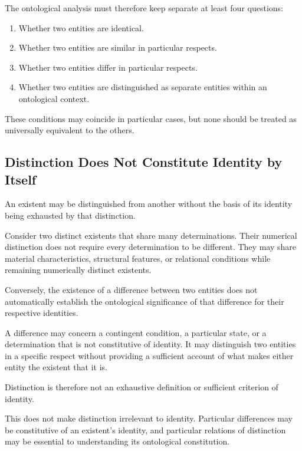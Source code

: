 The ontological analysis must therefore keep
separate at least four questions:

\begin{enumerate}
    \item Whether two entities are identical.
    \item Whether two entities are similar in
    particular respects.
    \item Whether two entities differ in particular
    respects.
    \item Whether two entities are distinguished
    as separate entities within an ontological
    context.
\end{enumerate}

These conditions may coincide in particular
cases, but none should be treated as universally
equivalent to the others.



\subsection{Distinction Does Not Constitute Identity by Itself}

An existent may be distinguished from another
without the basis of its identity being exhausted
by that distinction.

Consider two distinct existents that share many
determinations. Their numerical distinction does
not require every determination to be different.
They may share material characteristics,
structural features, or relational conditions
while remaining numerically distinct existents.

Conversely, the existence of a difference between
two entities does not automatically establish
the ontological significance of that difference
for their respective identities.

A difference may concern a contingent condition,
a particular state, or a determination that is
not constitutive of identity. It may distinguish
two entities in a specific respect without
providing a sufficient account of what makes
either entity the existent that it is.

Distinction is therefore not an exhaustive
definition or sufficient criterion of identity.

This does not make distinction irrelevant to
identity. Particular differences may be
constitutive of an existent's identity, and
particular relations of distinction may be
essential to understanding its ontological
constitution.

